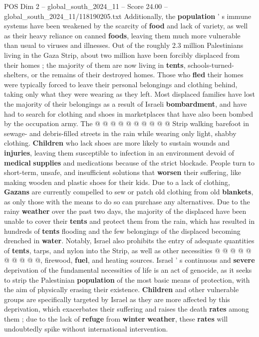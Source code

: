 \begin{textsample}{POS Dim 2 – global\_south\_2024\_11 – Score 24.00 – global\_south\_2024\_11/118190205.txt}
Additionally, the \textbf{population} ' s immune systems have been weakened by the scarcity of \textbf{food} and lack of variety, as well as their heavy reliance on canned \textbf{foods}, leaving them much more vulnerable than usual to viruses and illnesses.
Out of the roughly 2.3 million Palestinians living in the Gaza Strip, about two million have been forcibly displaced from their homes ; the majority of them are now living in \textbf{tents}, schools-turned-shelters, or the remains of their destroyed homes.
Those who \textbf{fled} their homes were typically forced to leave their personal belongings and clothing behind, taking only what they were wearing as they left.
Most displaced families have lost the majority of their belongings as a result of Israeli \textbf{bombardment}, and have had to search for clothing and shoes in marketplaces that have also been bombed by the occupation army.
The @ @ @ @ @ @ @ @ @ @ Strip walking barefoot in sewage- and debris-filled streets in the rain while wearing only light, shabby clothing. \textbf{Children} who lack shoes are more likely to sustain wounds and \textbf{injuries}, leaving them susceptible to infection in an environment devoid of \textbf{medical} \textbf{supplies} and medications because of the strict blockade.
People turn to short-term, unsafe, and insufficient solutions that \textbf{worsen} their suffering, like making wooden and plastic shoes for their kids.
Due to a lack of clothing, \textbf{Gazans} are currently compelled to sew or patch old clothing from old \textbf{blankets}, as only those with the means to do so can purchase any alternatives.
Due to the rainy \textbf{weather} over the past two days, the majority of the displaced have been unable to cover their \textbf{tents} and protect them from the rain, which has resulted in hundreds of \textbf{tents} flooding and the few belongings of the displaced becoming drenched in \textbf{water}.
Notably, Israel also prohibits the entry of adequate quantities of \textbf{tents}, tarps, and nylon into the Strip, as well as other necessities @ @ @ @ @ @ @ @ @ @, firewood, \textbf{fuel}, and heating sources.
Israel ' s continuous and \textbf{severe} deprivation of the fundamental necessities of life is an act of genocide, as it seeks to strip the Palestinian \textbf{population} of the most basic means of protection, with the aim of physically erasing their existence. \textbf{Children} and other vulnerable groups are specifically targeted by Israel as they are more affected by this deprivation, which exacerbates their suffering and raises the death \textbf{rates} among them ; due to the lack of \textbf{refuge} from \textbf{winter} \textbf{weather}, these \textbf{rates} will undoubtedly spike without international intervention.

\end{textsample}
